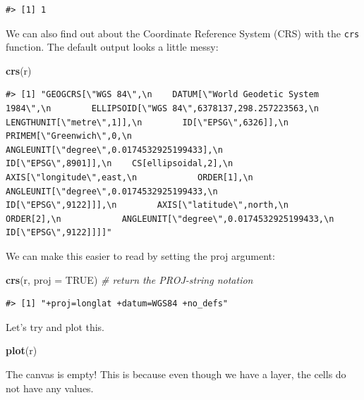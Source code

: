 \documentclass[
]{book}
\newenvironment{Shaded}{\begin{snugshade}}{\end{snugshade}}
\newcommand{\AttributeTok}[1]{\textcolor[rgb]{0.13,0.29,0.53}{#1}}
\newcommand{\CommentTok}[1]{\textcolor[rgb]{0.56,0.35,0.01}{\textit{#1}}}
\newcommand{\ConstantTok}[1]{\textcolor[rgb]{0.56,0.35,0.01}{#1}}
\newcommand{\FunctionTok}[1]{\textcolor[rgb]{0.13,0.29,0.53}{\textbf{#1}}}
\newcommand{\NormalTok}[1]{#1}
\begin{document}
\begin{verbatim}
#> [1] 1
\end{verbatim}

We can also find out about the Coordinate Reference System (CRS) with the \texttt{crs} function. The default output looks a little messy:

\begin{Shaded}
\begin{Highlighting}[]
\FunctionTok{crs}\NormalTok{(r)}
\end{Highlighting}
\end{Shaded}

\begin{verbatim}
#> [1] "GEOGCRS[\"WGS 84\",\n    DATUM[\"World Geodetic System 1984\",\n        ELLIPSOID[\"WGS 84\",6378137,298.257223563,\n            LENGTHUNIT[\"metre\",1]],\n        ID[\"EPSG\",6326]],\n    PRIMEM[\"Greenwich\",0,\n        ANGLEUNIT[\"degree\",0.0174532925199433],\n        ID[\"EPSG\",8901]],\n    CS[ellipsoidal,2],\n        AXIS[\"longitude\",east,\n            ORDER[1],\n            ANGLEUNIT[\"degree\",0.0174532925199433,\n                ID[\"EPSG\",9122]]],\n        AXIS[\"latitude\",north,\n            ORDER[2],\n            ANGLEUNIT[\"degree\",0.0174532925199433,\n                ID[\"EPSG\",9122]]]]"
\end{verbatim}

We can make this easier to read by setting the proj argument:

\begin{Shaded}
\begin{Highlighting}[]
\FunctionTok{crs}\NormalTok{(r, }\AttributeTok{proj =} \ConstantTok{TRUE}\NormalTok{) }\CommentTok{\# return the PROJ{-}string notation}
\end{Highlighting}
\end{Shaded}

\begin{verbatim}
#> [1] "+proj=longlat +datum=WGS84 +no_defs"
\end{verbatim}

Let's try and plot this.

\begin{Shaded}
\begin{Highlighting}[]
\FunctionTok{plot}\NormalTok{(r)}
\end{Highlighting}
\end{Shaded}

The canvas is empty! This is because even though we have a layer, the cells do not have any values.
\end{document}
